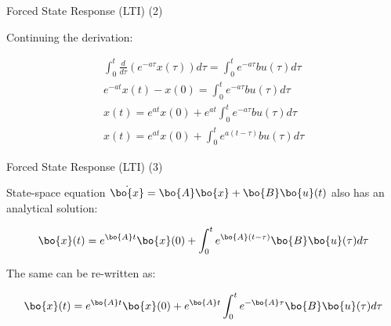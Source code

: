 \documentclass{beamer}
\begin{document}
\begin{frame}{Forced State Response (LTI) (2)}
	\begin{flushleft}
		
		Continuing the derivation:
		
		\begin{align}
			\int_{0}^{t} \frac{d}{d\tau} \left( e^{-a\tau} x(\tau) \right) d\tau = 	\int_{0}^{t}  e^{-a\tau} bu(\tau) d\tau
			\\
			e^{-at} x(t) - x(0) = \int_{0}^{t}  e^{-a\tau} bu(\tau) d\tau
			\\
			x(t) = e^{at} x(0) + e^{at} \int_{0}^{t}  e^{-a\tau} bu(\tau) d\tau
			\\
			x(t) = e^{at} x(0) + \int_{0}^{t}  e^{a(t-\tau)} bu(\tau) d\tau
		\end{align}
		
		
		
	\end{flushleft}
\end{frame}




\begin{frame}{Forced State Response (LTI) (3)}
	\begin{flushleft}
		
		State-space equation $\dot{\bo{x}} = \bo{A}  \bo{x} + \bo{B}  \bo{u}(t)$ also has an analytical solution:
		
		\begin{equation}
			\bo{x}(t) = e^{\bo{A}t}  \bo{x}(0) + 
			\int_{0}^{t} e^{\bo{A}(t-\tau)} \bo{B}  \bo{u}(\tau) d\tau
		\end{equation}
		
		The same can be re-written as:
		
		\begin{equation}
			\bo{x}(t) = e^{\bo{A}t}  \bo{x}(0) + 
			e^{\bo{A}t} \int_{0}^{t} e^{-\bo{A}\tau} \bo{B}  \bo{u}(\tau) d\tau
		\end{equation}
		
	\end{flushleft}
\end{frame}
\end{document}
